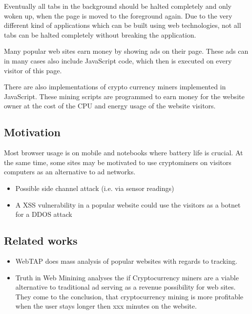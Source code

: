 \documentclass[article,type=bsc,colorback,accentcolor=tud9c]{tudthesis}
\begin{document}
  Eventually all tabs in the background should be halted completely and only woken up, when the page is moved to the foreground again. Due to the very different kind of applications which can be built using web technologies, not all tabs can be halted completely without breaking the application.

  Many popular web sites earn money by showing ads on their page. These ads can in many cases also include JavaScript code, which then is executed on every visitor of this page.

  There are also implementations of crypto currency miners implemented in JavaScript. These mining scripts are programmed to earn money for the website owner at the cost of the CPU and energy usage of the website visitors.
  
  \subsection{Motivation}

  Most browser usage is on mobile and notebooks where battery life is crucial.\autocite{webkit-web-content-power-usage} At the same time, some sites may be motivated to use cryptominers on visitors computers as an alternative to ad networks.
  
  \begin{itemize}
  \item Possible side channel attack (i.e. via sensor readings)
  \item A XSS vulnerability in a popular website could use the visitors as a botnet for a DDOS attack
  \end{itemize}

  \subsection{Related works}

  \begin{itemize}
  \item WebTAP does mass analysis of popular websites with regards to tracking.\autocite{webtap}

  \item Truth in Web Minining analyses the if Cryptocurrency miners are a viable alternative to traditional ad serving as a revenue possibility for web sites.\autocite{papadopoulos2018truth} They come to the conclusion, that cryptocurrency mining is more profitable when the user stays longer then xxx minutes on the website.
  

  \end{itemize}
\end{document}
